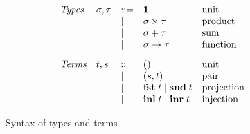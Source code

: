 \begin{figure}
  \small
  \[
  \begin{array}{lllll}
    \textit{Types} &
    \sigma, \tau
    & ::= &
    \mathbf{1}
    &
    \text{unit}
    \\
    && \mid &
    \sigma \times \tau
    &
    \text{product}
    \\
    && \mid &
    \sigma + \tau
    &
    \text{sum}
    \\
    && \mid &
    \sigma \to \tau
    &
    \text{function}
    \\[3mm]
    \textit{Terms} &
    t, s
    & ::= &
    ()
    &
    \text{unit}
    \\
    && \mid &
    (s,t)
    &
    \text{pair}
    \\
    && \mid &
    \mathbf{fst}\;t \mid \mathbf{snd}\;t
    &
    \text{projection}
    \\
    && \mid &
    \mathbf{inl}\;t \mid \mathbf{inr}\;t
    &
    \text{injection}
    \\
  \end{array}
  \]
  \caption{Syntax of types and terms }
\end{figure}
